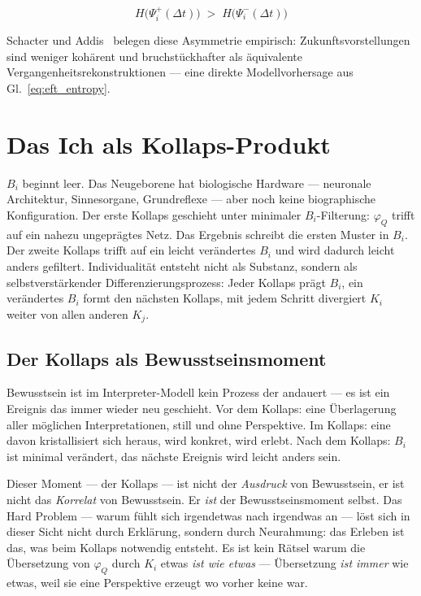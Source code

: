 \documentclass[11pt,a4paper]{article}
\begin{document}
\begin{equation}
  H\!\bigl(\Psi_i^+(\Delta t)\bigr) \;>\; H\!\bigl(\Psi_i^-(\Delta t)\bigr)
  \label{eq:eft_entropy}
\end{equation}

Schacter und Addis~\citep{schacter2007} belegen diese Asymmetrie empirisch:
Zukunftsvorstellungen sind weniger kohärent und bruchstückhafter als
äquivalente Vergangenheitsrekonstruktionen — eine direkte Modellvorhersage
aus Gl.~\eqref{eq:eft_entropy}.


\section{Das Ich als Kollaps-Produkt}

$B_i$ beginnt leer. Das Neugeborene hat biologische Hardware — neuronale
Architektur, Sinnesorgane, Grundreflexe — aber noch keine biographische
Konfiguration. Der erste Kollaps geschieht unter minimaler $B_i$-Filterung:
$\varphi_Q$ trifft auf ein nahezu ungeprägtes Netz. Das Ergebnis schreibt
die ersten Muster in $B_i$. Der zweite Kollaps trifft auf ein leicht
verändertes $B_i$ und wird dadurch leicht anders gefiltert.
Individualität entsteht nicht als Substanz, sondern als selbstverstärkender
Differenzierungsprozess: Jeder Kollaps prägt $B_i$, ein verändertes $B_i$
formt den nächsten Kollaps, mit jedem Schritt divergiert $K_i$ weiter von
allen anderen $K_j$.

\subsection*{Der Kollaps als Bewusstseinsmoment}

Bewusstsein ist im Interpreter-Modell kein Prozess der andauert —
es ist ein Ereignis das immer wieder neu geschieht. Vor dem Kollaps:
eine Überlagerung aller möglichen Interpretationen, still und ohne
Perspektive. Im Kollaps: eine davon kristallisiert sich heraus, wird
konkret, wird erlebt. Nach dem Kollaps: $B_i$ ist minimal verändert,
das nächste Ereignis wird leicht anders sein.

Dieser Moment — der Kollaps — ist nicht der \emph{Ausdruck} von
Bewusstsein, er ist nicht das \emph{Korrelat} von Bewusstsein.
Er \emph{ist} der Bewusstseinsmoment selbst. Das Hard Problem —
warum fühlt sich irgendetwas nach irgendwas an — löst sich in dieser
Sicht nicht durch Erklärung, sondern durch Neurahmung: das Erleben
ist das, was beim Kollaps notwendig entsteht. Es ist kein Rätsel
warum die Übersetzung von $\varphi_Q$ durch $K_i$ etwas
\emph{ist wie etwas} — Übersetzung \emph{ist immer} wie etwas,
weil sie eine Perspektive erzeugt wo vorher keine war.
\end{document}
